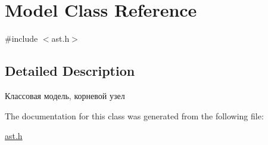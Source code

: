 \hypertarget{classModel}{}\section{Model Class Reference}
\label{classModel}


{\ttfamily \#include $<$ast.\+h$>$}



\subsection{Detailed Description}
Классовая модель, корневой узел 

The documentation for this class was generated from the following file\+:\begin{DoxyCompactItemize}
\item 
\hyperlink{ast_8h}{ast.\+h}\end{DoxyCompactItemize}
